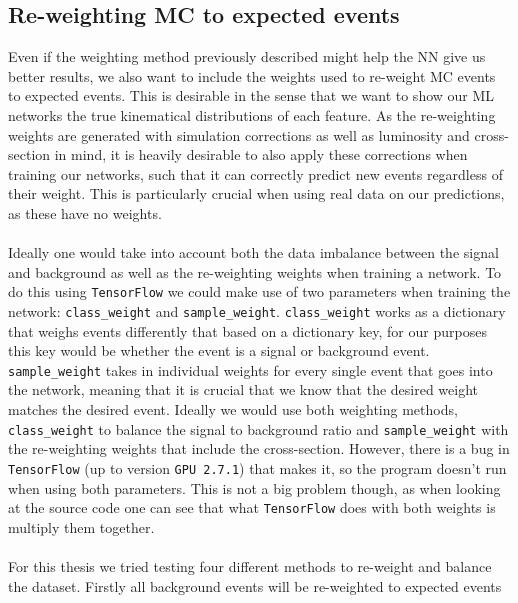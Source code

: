 \documentclass[12pt, a4paper]{book}
\begin{document}
\subsection{Re-weighting MC to expected events}\label{sec:sample_wgts_NN}
Even if the weighting method previously described might help the NN give us better results, we also want to include the weights used to re-weight MC events to expected events. This is desirable in the sense that we want to show our ML networks the true kinematical distributions of each feature.
As the re-weighting weights are generated with simulation corrections as well as luminosity and cross-section in mind, it is heavily desirable to also apply these corrections when training our networks, such that it can correctly predict new events regardless of their weight. This is particularly 
crucial when using real data on our predictions, as these have no weights.\\
\\Ideally one would take into account both the data imbalance between the signal and background as well as the re-weighting weights when training a network. To do this using \verb|TensorFlow| we could make use of two parameters when training the network: \verb|class_weight| and \verb|sample_weight|. 
\verb|class_weight| works as a dictionary that weighs events differently that based on a dictionary key, for our purposes this key would be whether the event is a signal or background event. 
\verb|sample_weight| takes in individual weights for every single event that goes into the network, meaning that it is crucial that we know that the desired weight matches the desired event. Ideally we would use both weighting methods, \verb|class_weight| to balance the signal to 
background ratio and \verb|sample_weight| with the re-weighting weights that include the cross-section. However, there is a bug in \verb|TensorFlow| (up to version \verb|GPU 2.7.1|) that makes it, so the program doesn't run when using both parameters. This is not a big problem though, as when looking at the source code \cite{Keras_source_code} 
one can see that what \verb|TensorFlow| does with both weights is multiply them together. \\
\\For this thesis we tried testing four different methods to re-weight and balance the dataset. Firstly all background events will be re-weighted to expected events %
\end{document}
